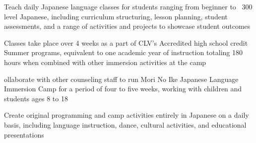 \documentclass[letterpaper]{deedy-resume_sm} %
\begin{document}
\begin{tightitemize}
\item Teach daily Japanese language classes for students ranging from beginner to ~300 level Japanese, including curriculum structuring, lesson planning, student assessments, and a range of activities and projects to showcase student outcomes
\item Classes take place over 4 weeks as a part of CLV's Accredited high school credit Summer programs, equivalent to one academic year of instruction totaling 180 hours when combined with other immersion activities at the camp
\end{tightitemize}
\begin{tightitemize}
\item ollaborate with other counseling staff to run Mori No Ike Japanese Language Immersion Camp for a period of four to five weeks, working with children and students ages 8 to 18
\item Create original programming and camp activities entirely in Japanese on a daily basis, including language instruction, dance, cultural activities, and educational presentations
\end{tightitemize}
\end{document}
